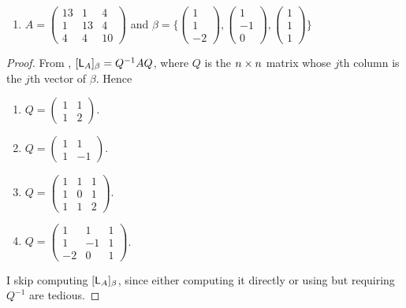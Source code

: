 \begin{exercise}
\begin{enumerate}
\item \(A = \begin{pmatrix} 13 & 1 & 4 \\ 1 & 13 & 4 \\ 4 & 4 & 10 \end{pmatrix}\) and \(\beta = \bigg\{
    \begin{pmatrix} 1 \\ 1 \\ -2 \end{pmatrix},
    \begin{pmatrix} 1 \\ -1 \\ 0 \end{pmatrix},
    \begin{pmatrix} 1 \\ 1 \\ 1 \end{pmatrix}
\bigg\}\)
\end{enumerate}
\end{exercise}

\begin{proof}
From , \([\textsf{L}_A]_{\beta} = Q^{-1} A Q\), where \(Q\) is the \(n \times n\) matrix whose \(j\)th column is the \(j\)th vector of \(\beta\).
Hence

\begin{enumerate}
\item \(Q = \begin{pmatrix} 1 & 1 \\ 1 & 2 \end{pmatrix}\).

\item \(Q = \begin{pmatrix} 1 & 1 \\ 1 & -1 \end{pmatrix}\).

\item \(Q = \begin{pmatrix} 1 & 1 & 1 \\ 1 & 0 & 1 \\ 1 & 1 & 2 \end{pmatrix}\).

\item \(Q = \begin{pmatrix} 1 & 1 & 1 \\ 1 & -1 & 1 \\ -2 & 0 & 1 \end{pmatrix}\).
\end{enumerate}

I skip computing \([\textsf{L}_A]_{\beta}\), since either computing it directly or using  but requiring \(Q^{-1}\) are tedious.
\end{proof}

